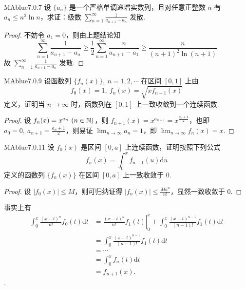 \begin{problem}{MAblue}{7.0.7}
    设 $\{ a_n \}$ 是一个严格单调递增实数列，且对任意正整数 $n$ 有 $a_n \leqslant n^2 \ln n$，求证：级数 $\sum_{n=1}^\infty \frac 1 {a_{n+1}-a_n}$ 发散.
\end{problem}

\begin{proof}
    不妨令 $a_1 = 0$，则由上题结论知
    \[
        \sum_{n=1}^{\infty} \frac 1 {a_{n+1} - a_n} \geqslant \frac 1 2 \sum_{n=1}^{\infty} \frac n {a_{n+1} - a_1} \geqslant \frac n {(n+1)^2 \ln(n+1)}
    \]
    故 $\sum_{n=1}^{\infty} \frac 1 {a_{n+1} - a_n}$ 发散.
\end{proof}

\begin{problem}{MAblue}{7.0.9}
    设函数列 $\{ f_n(x) \},\ n = 1, 2, \cdots$ 在区间 $[0, 1]$ 上由
    \[
        f_0(x) = 1,\ f_n(x) = \sqrt{xf_{n-1}(x)}
    \]
    定义，证明当 $n \to \infty$ 时，函数列在 $[0, 1]$ 上一致收敛到一个连续函数.
\end{problem}

\begin{proof}
    设 $f_n(x) = x^{a_n} \ (n \in \mathbb N)$，则 $f_{n+1}(x) = x^{a_{n+1}} = x^{\frac {a_n + 1} 2}$，也即 $a_0 = 0,\ a_{n+1} = \frac {a_n + 1} 2$，则易证 $\lim_{n \to \infty} a_n = 1$，即 $\lim_{n \to \infty} f_n(x) = x$.
\end{proof}

\begin{problem}{MAblue}{7.0.11}
    设 $f_0(x)$ 是区间 $[0, a]$ 上连续函数，证明按照下列公式
    \[
        f_n(x) = \int_0^x f_{n-1}(u) \mathrm du
    \]
    定义的函数列 $\{ f_n(x) \}$ 在区间 $[0, a]$ 上一致收敛于 $0$.
\end{problem}

\begin{proof}
    设 $|f_0(x)| \leqslant M$，则可归纳证得 $|f_n(x)| \leqslant \frac{Ma^n}{n!}$，显然一致收敛于 $0$.
\end{proof}

{\flushleft 事实上有}
\begin{align*}
    \int_0^x \frac{(x-t)^n}{n!} f_0(t) \mathrm dt &= \left. \frac{(x-t)^n}{n!} f_1(t) \right|_0^x + \int_0^x \frac{(x-t)^{n-1}}{(n-1)!} f_1(t) \mathrm dt \\
    &= \int_0^x \frac{(x-t)^{n-1}}{(n-1)!} f_1(t) \mathrm dt \\
    &= \cdots \\
    &= \int_0^x f_n(t) \mathrm dt \\
    &= f_{n+1}(x).
\end{align*}.